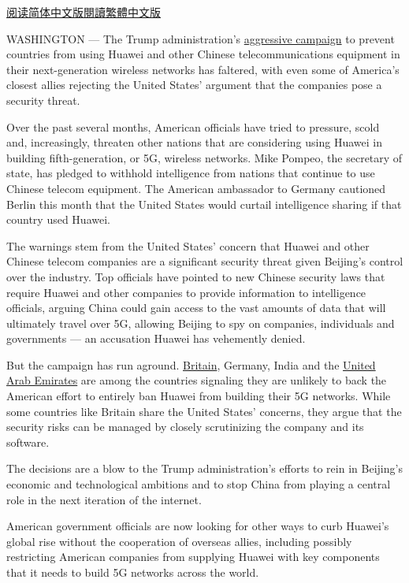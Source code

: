 \href{https://cn.nytimes.com/usa/20190318/huawei-ban/}{阅读简体中文版}\href{https://cn.nytimes.com/usa/20190318/huawei-ban/zh-hant/}{閱讀繁體中文版}

WASHINGTON --- The Trump administration's
\href{https://www.nytimes.com/2019/01/26/us/politics/huawei-china-us-5g-technology.html}{aggressive
campaign} to prevent countries from using Huawei and other Chinese
telecommunications equipment in their next-generation wireless networks
has faltered, with even some of America's closest allies rejecting the
United States' argument that the companies pose a security threat.

Over the past several months, American officials have tried to pressure,
scold and, increasingly, threaten other nations that are considering
using Huawei in building fifth-generation, or 5G, wireless networks.
Mike Pompeo, the secretary of state, has pledged to withhold
intelligence from nations that continue to use Chinese telecom
equipment. The American ambassador to Germany cautioned Berlin this
month that the United States would curtail intelligence sharing if that
country used Huawei.

The warnings stem from the United States' concern that Huawei and other
Chinese telecom companies are a significant security threat given
Beijing's control over the industry. Top officials have pointed to new
Chinese security laws that require Huawei and other companies to provide
information to intelligence officials, arguing China could gain access
to the vast amounts of data that will ultimately travel over 5G,
allowing Beijing to spy on companies, individuals and governments --- an
accusation Huawei has vehemently denied.

But the campaign has run aground.
\href{https://www.nytimes.com/2019/02/20/business/huawei-uk-trump.html}{Britain},
Germany, India and the
\href{https://www.nytimes.com/2019/02/26/technology/huawei-uae-5g-network.html}{United
Arab Emirates} are among the countries signaling they are unlikely to
back the American effort to entirely ban Huawei from building their 5G
networks. While some countries like Britain share the United States'
concerns, they argue that the security risks can be managed by closely
scrutinizing the company and its software.

The decisions are a blow to the Trump administration's efforts to rein
in Beijing's economic and technological ambitions and to stop China from
playing a central role in the next iteration of the internet.

American government officials are now looking for other ways to curb
Huawei's global rise without the cooperation of overseas allies,
including possibly restricting American companies from supplying Huawei
with key components that it needs to build 5G networks across the world.

